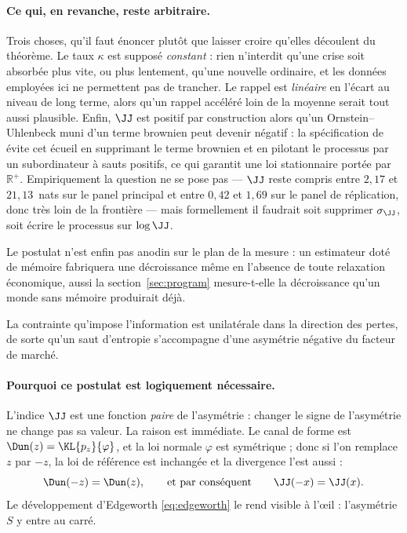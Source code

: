 \paragraph{Ce qui, en revanche, reste arbitraire.} Trois choses, qu'il faut
énoncer plutôt que laisser croire qu'elles découlent du théorème. Le taux
$\kappa$ est supposé \emph{constant} : rien n'interdit qu'une crise soit
absorbée plus vite, ou plus lentement, qu'une nouvelle ordinaire, et les données
employées ici ne permettent pas de trancher. Le rappel est \emph{linéaire} en
l'écart au niveau de long terme, alors qu'un rappel accéléré loin de la moyenne
serait tout aussi plausible. Enfin, $\JJ$ est positif par construction alors
qu'un Ornstein--Uhlenbeck muni d'un terme brownien peut devenir négatif : la
spécification de \citet{bns2001} évite cet écueil en supprimant le terme
brownien et en pilotant le processus par un subordinateur à sauts positifs, ce
qui garantit une loi stationnaire portée par $\mathbb{R}^+$. Empiriquement la
question ne se pose pas --- $\JJ$ reste compris entre $2{,}17$ et $21{,}13$~nats
sur le panel principal et entre $0{,}42$ et $1{,}69$ sur le panel de
réplication, donc très loin de la frontière --- mais formellement il faudrait
soit supprimer $\sigma_\JJ$, soit écrire le processus sur $\log\JJ$.

Le postulat n'est enfin pas anodin sur le plan de la mesure : un estimateur doté
de mémoire fabriquera une décroissance même en l'absence de toute relaxation
économique, aussi la section~\ref{sec:program} mesure-t-elle la décroissance
qu'un monde sans mémoire produirait déjà.

\begin{postulate}
\label{p:sign}
La contrainte qu'impose l'information est unilatérale dans la direction des
pertes, de sorte qu'un saut d'entropie s'accompagne d'une asymétrie négative du
facteur de marché.
\end{postulate}

\paragraph{Pourquoi ce postulat est logiquement nécessaire.} L'indice $\JJ$ est
une fonction \emph{paire} de l'asymétrie : changer le signe de l'asymétrie ne
change pas sa valeur. La raison est immédiate. Le canal de forme est
$\Dun(z)=\KL{p_z}{\varphi}$, et la loi normale $\varphi$ est symétrique ; donc
si l'on remplace $z$ par $-z$, la loi de référence est inchangée et la
divergence l'est aussi :
\begin{equation}
\label{eq:even}
\Dun(-z)=\Dun(z),\qquad\text{et par conséquent}\qquad \JJ(-x)=\JJ(x).
\end{equation}
Le développement d'Edgeworth \eqref{eq:edgeworth} le rend visible à l'\oe il :
l'asymétrie $S$ y entre au carré.

